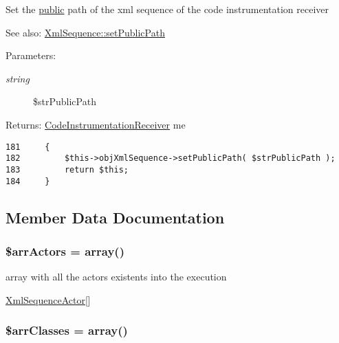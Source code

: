 Set the \hyperlink{namespacepublic}{public} path of the xml sequence of the code instrumentation receiver

\begin{Desc}
\item[See also:]\hyperlink{class_xml_sequence_261f2bb173e655f2ead64eda4c29e76a}{XmlSequence::setPublicPath} \end{Desc}
\begin{Desc}
\item[Parameters:]
\begin{description}
\item[{\em string}]\$strPublicPath \end{description}
\end{Desc}
\begin{Desc}
\item[Returns:]\hyperlink{class_code_instrumentation_receiver}{CodeInstrumentationReceiver} me \end{Desc}


\begin{Code}\begin{verbatim}181     {
182         $this->objXmlSequence->setPublicPath( $strPublicPath );
183         return $this;
184     }
\end{verbatim}
\end{Code}




\subsection{Member Data Documentation}
\hypertarget{class_code_instrumentation_receiver_51bd2c8dc9510ff43aaf11f3129bea0f}{
\subsubsection[{\$arrActors}]{\setlength{\rightskip}{0pt plus 5cm}\$arrActors = array()}}
\label{class_code_instrumentation_receiver_51bd2c8dc9510ff43aaf11f3129bea0f}


array with all the actors existents into the execution

\hyperlink{class_xml_sequence_actor}{XmlSequenceActor}\mbox{[}\mbox{]} \hypertarget{class_code_instrumentation_receiver_d0ae260f94228a6360e0a72c8245bb60}{
\subsubsection[{\$arrClasses}]{\setlength{\rightskip}{0pt plus 5cm}\$arrClasses = array()}}
\label{class_code_instrumentation_receiver_d0ae260f94228a6360e0a72c8245bb60}


